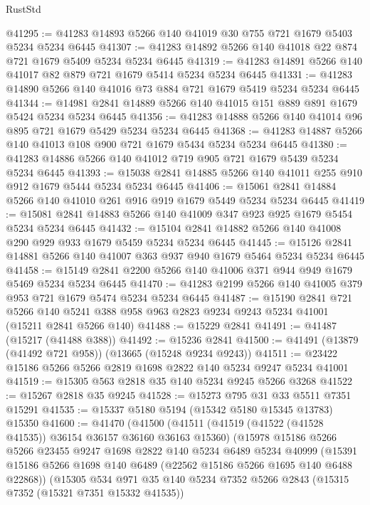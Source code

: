 \begin{lexlean}{RustStd}
\begin{coremodule}
@41295 := @41283 @14893 @5266 @140 @41019 @30 @755 @721 @1679 @5403 @5234 @5234 @6445
@41307 := @41283 @14892 @5266 @140 @41018 @22 @874 @721 @1679 @5409 @5234 @5234 @6445
@41319 := @41283 @14891 @5266 @140 @41017 @82 @879 @721 @1679 @5414 @5234 @5234 @6445
@41331 := @41283 @14890 @5266 @140 @41016 @73 @884 @721 @1679 @5419 @5234 @5234 @6445
@41344 := @14981 @2841 @14889 @5266 @140 @41015 @151 @889 @891 @1679 @5424 @5234 @5234 @6445
@41356 := @41283 @14888 @5266 @140 @41014 @96 @895 @721 @1679 @5429 @5234 @5234 @6445
@41368 := @41283 @14887 @5266 @140 @41013 @108 @900 @721 @1679 @5434 @5234 @5234 @6445
@41380 := @41283 @14886 @5266 @140 @41012 @719 @905 @721 @1679 @5439 @5234 @5234 @6445
@41393 := @15038 @2841 @14885 @5266 @140 @41011 @255 @910 @912 @1679 @5444 @5234 @5234 @6445
@41406 := @15061 @2841 @14884 @5266 @140 @41010 @261 @916 @919 @1679 @5449 @5234 @5234 @6445
@41419 := @15081 @2841 @14883 @5266 @140 @41009 @347 @923 @925 @1679 @5454 @5234 @5234 @6445
@41432 := @15104 @2841 @14882 @5266 @140 @41008 @290 @929 @933 @1679 @5459 @5234 @5234 @6445
@41445 := @15126 @2841 @14881 @5266 @140 @41007 @363 @937 @940 @1679 @5464 @5234 @5234 @6445
@41458 := @15149 @2841 @2200 @5266 @140 @41006 @371 @944 @949 @1679 @5469 @5234 @5234 @6445
@41470 := @41283 @2199 @5266 @140 @41005 @379 @953 @721 @1679 @5474 @5234 @5234 @6445
@41487 := @15190
    @2841
    @721
    @5266
    @140
    @5241
    @388
    @958
    @963
    @2823
    @9234
    @9243
    @5234
    @41001
    (@15211 @2841 @5266 @140)
@41488 := @15229 @2841
@41491 := @41487 (@15217 (@41488 @388))
@41492 := @15236 @2841
@41500 := @41491 (@13879 (@41492 @721 @958)) (@13665 (@15248 @9234 @9243))
@41511 := @23422 @15186 @5266 @5266 @2819 @1698 @2822 @140 @5234 @9247 @5234 @41001
@41519 := @15305 @563 @2818 @35 @140 @5234 @9245 @5266 @3268
@41522 := @15267 @2818 @35 @9245
@41528 := @15273 @795 @31 @33 @5511 @7351 @15291
@41535 := @15337 @5180 @5194 (@15342 @5180 @15345 @13783) @15350
@41600 := @41470
    (@41500
      (@41511
        (@41519 (@41522 (@41528 @41535)) @36154 @36157 @36160 @36163 @15360)
        (@15978
          @15186
          @5266
          @5266
          @23455
          @9247
          @1698
          @2822
          @140
          @5234
          @6489
          @5234
          @40999
          (@15391 @15186 @5266 @1698 @140 @6489 (@22562 @15186 @5266 @1695 @140 @6488 @22868))
          (@15305
            @534
            @971
            @35
            @140
            @5234
            @7352
            @5266
            @2843
            (@15315 @7352 (@15321 @7351 @15332 @41535))

\end{coremodule}
\end{lexlean}
